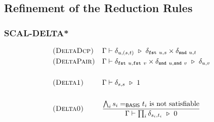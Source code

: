 \subsection{Refinement of the Reduction Rules}

\subsubsection*{\textsf{SCAL-DELTA*}}
\begin{align*}
  & \textsc{(DeltaDcp)} && 
  \Gamma \vdash \delta_{u, (s, t)} \ \triangleright\  \delta_{\texttt{fst}\ u, s} \times \delta_{\texttt{snd}\ u, t} \\
  & \textsc{(DeltaPair)} &&
  \Gamma \vdash \delta_{\texttt{fst}\ u, \texttt{fst}\ v}\times\delta_{\texttt{snd}\ u, \texttt{snd}\ v} \ \triangleright\  \delta_{u, v}\\
  \\ 
  & \textsc{(Delta1)} && 
  \Gamma \vdash \delta_{s, s} \ \triangleright\  1
  \\
  \\
  & \textsc{(Delta0)} && 
  \frac{\bigwedge_i s_i =_\textsf{BASIS} t_i \textrm{ is not satisfiable}}{\Gamma \vdash \prod_i \delta_{s_i, t_i} \ \triangleright\  0}
\end{align*}